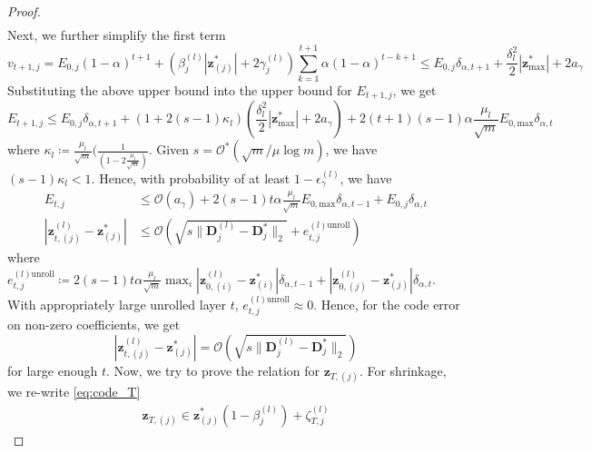 \documentclass[10pt]{article} %
\newcommand{\D}{{\bm D}}
\newcommand{\z}{{\bm z}}
\begin{document}
\begin{proof}
\begin{equation}
\begin{aligned}
\end{aligned}
\end{equation}
Next, we further simplify the first term
\begin{equation}
v_{t+1, j} = E_{0, j} (1 - \alpha)^{t+1} + (\beta_j^{(l)} | \z^{\ast}_{(j)} | + 2 \gamma_j^{(l)}) \sum_{k=1}^{t+1} \alpha (1 - \alpha)^{t-k+1}
\leq E_{0, j} \delta_{\alpha,t+1} + \frac{\delta_l^2}{2} | \z^{\ast}_{\text{max}} | + 2 a_{\gamma}
\end{equation}
Substituting the above upper bound into the upper bound for $E_{t+1,j}$, we get
\begin{equation}
E_{t+1, j} \leq E_{0, j} \delta_{\alpha,t+1} + (1 + 2 (s-1) \kappa_l) (\frac{\delta_l^2}{2} | \z_{\text{max}}^{\ast}| + 2 a_{\gamma}) + 2 (t+1)(s-1) \alpha \frac{\mu_l}{\sqrt{m}} E_{0, \text{max}} \delta_{\alpha,t}
\end{equation}
where $\kappa_l \coloneqq \frac{\mu_l}{\sqrt{m}} (\frac{1}{ (1 - 2 \frac{\mu_l}{\sqrt{m}})}$. Given $s = \mathcal{O}^{\ast}(\sqrt{m}/\mu \log{m})$, we have $(s-1) \kappa_l < 1$. Hence, with probability of at least $1 - \epsilon_{\gamma}^{(l)}$, we have
\begin{equation}
\begin{aligned}
E_{t, j} &\leq  \mathcal{O}(a_{\gamma}) + 2(s-1)t \alpha \frac{\mu_l}{\sqrt{m}} E_{0, \text{max}} \delta_{\alpha,t-1} + E_{0, j} \delta_{\alpha,t}\\
|\z_{t,(j)}^{(l)} - \z_{(j)}^{\ast} | &\leq  \mathcal{O}(\sqrt{s \| \D_j^{(l)} - \D_j^{\ast} \|_2} + e_{t,j}^{(l)\text{unroll}})
\end{aligned}
\end{equation}
where $e_{t,j}^{(l)\text{unroll}} \coloneqq 2(s-1)t \alpha \frac{\mu_l}{\sqrt{m}} \max_i | \z_{0,(i)}^{(l)} - \z_{(i)}^{\ast} | \delta_{\alpha,t-1} + | \z_{0,(j)}^{(l)} - \z_{(j)}^{\ast} | \delta_{\alpha,t}$. With appropriately large unrolled layer $t$, $e_{t,j}^{(l)\text{unroll}} \approx 0$. Hence, for the code error on non-zero coefficients, we get
\begin{equation}
|\z_{t,(j)}^{(l)} - \z_{(j)}^{\ast} | = \mathcal{O}(\sqrt{s \| \D_j^{(l)} - \D_j^{\ast} \|_2})
\end{equation}
for large enough $t$. Now, we try to prove the relation for $\z_{T, (j)}$. For shrinkage, we re-write \eqref{eq:code_T}
\begin{equation}
\begin{aligned}
\z_{T, (j)} \in \z^{\ast}_{(j)} (1 - \beta_j^{(l)}) + \zeta_{T,j}^{(l)}
\end{aligned}

\end{equation}
\end{proof}
\end{document}
